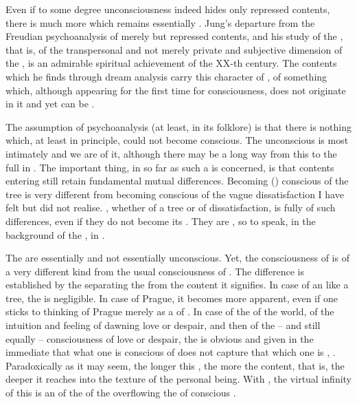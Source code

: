 Even if to some degree unconsciousness indeed hides only repressed 
contents, there is much more which remains essentially . Jung's
departure from the Freudian psychoanalysis of merely  but repressed
contents, and his study of the , that is, of the
transpersonal and not merely private and subjective dimension of the
, is an admirable spiritual achievement of the XX-th century.
The  contents which he finds through dream analysis carry this
character of , of something which, although appearing for the
first time for consciousness, does not originate in it and yet can be
.  

The assumption of psychoanalysis (at least, in its folklore) is that
there is nothing which, at least in principle, could not become
conscious. The unconscious is most intimately  and we are
 of it, although there may be a long way from this 
to the full  in . The important thing, in so far as
such a  is concerned, is that contents entering
 still retain fundamental mutual differences. Becoming
() conscious of the tree  is very different
from becoming conscious of the vague dissatisfaction I have felt but did not
realise. , whether of a tree or of dissatisfaction, is fully
 of such differences, even if they do not become its .
They are , so to speak,
in the background of the , in .

The  are essentially  and not essentially
unconscious. Yet, the consciousness of  is of a very different
kind from the usual consciousness of .  The difference is
established by the  separating the  from the
content it signifies.  In case of an  like a tree, the
 is negligible.  In case of Prague, it becomes more apparent, even
if one sticks to thinking of Prague merely as a  of .  In case of the  of the world, of the 
intuition and  feeling of dawning love or despair, and then of the
 -- and still equally  -- consciousness of love or despair,
the  is obvious and given in the immediate  that what
one is  conscious of does not capture that which one is
, .  Paradoxically as it may seem, the
longer this , the more  the content, that is, the
deeper it reaches into the texture of the personal being. With ,
the virtual infinity of this  is an  of the  of the  overflowing the  of
conscious .

